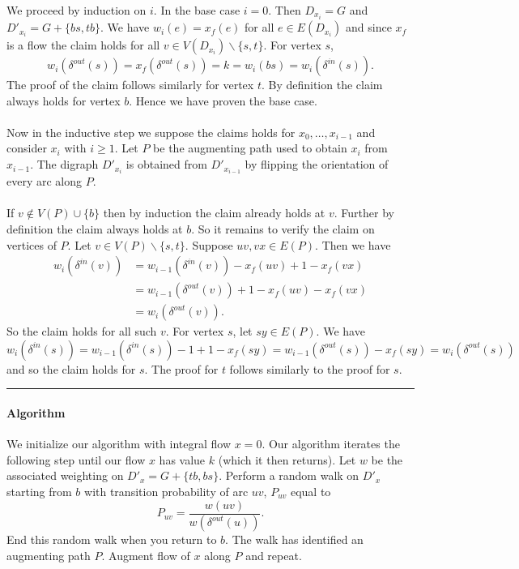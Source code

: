 \documentclass[letterpaper,12pt,oneside,onecolumn]{article}
\newenvironment{proof}{{\bf Proof:  }}{\hfill\rule{2mm}{2mm}}
\begin{document}
\begin{proof}
We proceed by induction on $i$. In the base case $i = 0$. Then $D_{x_i} = G$ and $D'_{x_i} = G + \{bs, tb\}$. We have $w_i(e) = x_f(e)$ for all $e \in E(D_{x_i})$ and since $x_f$ is a flow the claim holds for all $v \in V(D_{x_i})\backslash\{s,t\}$. For vertex $s$,
$$w_i(\delta^{out}(s)) = x_f(\delta^{out}(s)) = k = w_i(bs) = w_i(\delta^{in}(s)).$$
The proof of the claim follows similarly for vertex $t$. By definition the claim always holds for vertex $b$. Hence we have proven the base case.
\paragraph{}
Now in the inductive step we suppose the claims holds for $x_0, \dots, x_{i-1}$ and consider $x_i$ with $i \geq 1$. Let $P$ be the augmenting path used to obtain $x_i$ from $x_{i-1}$. The digraph $D'_{x_i}$ is obtained from $D'_{x_{i-1}}$ by flipping the orientation of every arc along $P$.

\paragraph{} If $v \not\in V(P) \cup \{b\}$ then by induction the claim already holds at $v$. Further by definition the claim always holds at $b$. So it remains to verify the claim on vertices of $P$. Let $v \in V(P)\backslash\{s,t\}$. Suppose $uv, vx \in E(P)$. Then we have
\begin{align*}
w_i(\delta^{in}(v)) &= w_{i-1}(\delta^{in}(v)) -x_f(uv) + 1-x_f(vx)\\
&=w_{i-1}(\delta^{out}(v)) + 1-x_f(uv) -x_f(vx) \\
&=w_i(\delta^{out}(v)).
\end{align*}
So the claim holds for all such $v$. For vertex $s$, let $sy \in E(P)$. We have
$$w_i(\delta^{in}(s)) = w_{i-1}(\delta^{in}(s)) -1 + 1-x_f(sy) = w_{i-1}(\delta^{out}(s)) -x_f(sy) = w_i(\delta^{out}(s))$$
and so the claim holds for $s$. The proof for $t$ follows similarly to the proof for $s$.
\end{proof}
\paragraph{Algorithm}
We initialize our algorithm with integral flow $x = 0$. Our algorithm iterates the following step until our flow $x$ has value $k$ (which it then returns). Let $w$ be the associated weighting on $D'_{x} = G + \{tb,bs\}$. Perform a random walk on $D'_x$ starting from $b$ with transition probability of arc $uv$, $P_{uv}$ equal to 
$$P_{uv} = \frac{w(uv)}{w(\delta^{out}(u))}.$$
End this random walk when you return to $b$. The walk has identified an augmenting path $P$. Augment flow of $x$ along $P$ and repeat.
\end{document}

